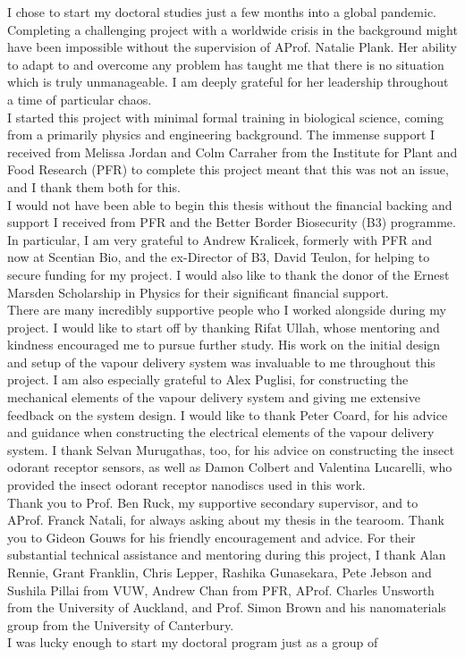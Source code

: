 \documentclass[
  a4paper,
]{scrbook}
\begin{document}
\begin{spacing}{1.2} 
\newpage
\fancyhf{} %
\thispagestyle{fancy} %
\renewcommand{\headrulewidth}{0pt}
\fancyfoot[L]{\thepage} %
I chose to start my doctoral studies just a few months into a global pandemic. Completing a challenging project with a worldwide crisis in the background might have been impossible without the supervision of AProf. Natalie Plank. Her ability to adapt to and overcome any problem has taught me that there is no situation which is truly unmanageable. I am deeply grateful for her leadership throughout a time of particular chaos. \\[5pt] I started this project with minimal formal training in biological science, coming from a primarily physics and engineering background. The immense support I received from Melissa Jordan and Colm Carraher from the Institute for Plant and Food Research (PFR) to complete this project meant that this was not an issue, and I thank them both for this. \\[5pt] I would not have been able to begin this thesis without the financial backing and support I received from PFR and the Better Border Biosecurity (B3) programme. In particular, I am very grateful to Andrew Kralicek, formerly with PFR and now at Scentian Bio, and the ex-Director of B3, David Teulon, for helping to secure funding for my project. I would also like to thank the donor of the Ernest Marsden Scholarship in Physics for their significant financial support. \\[5pt] There are many incredibly supportive people who I worked alongside during my project. I would like to start off by thanking Rifat Ullah, whose mentoring and kindness encouraged me to pursue further study. His work on the initial design and setup of the vapour delivery system was invaluable to me throughout this project. I am also especially grateful to Alex Puglisi, for constructing the mechanical elements of the vapour delivery system and giving me extensive feedback on the system design. I would like to thank Peter Coard, for his advice and guidance when constructing the electrical elements of the vapour delivery system. I thank Selvan Murugathas, too, for his advice on constructing the insect odorant receptor sensors, as well as Damon Colbert and Valentina Lucarelli, who provided the insect odorant receptor nanodiscs used in this work. \\[5pt] Thank you to Prof. Ben Ruck, my supportive secondary supervisor, and to AProf. Franck Natali, for always asking about my thesis in the tearoom. Thank you to Gideon Gouws for his friendly encouragement and advice. For their substantial technical assistance and mentoring during this project, I thank Alan Rennie, Grant Franklin, Chris Lepper, Rashika Gunasekara, Pete Jebson and Sushila Pillai from VUW, Andrew Chan from PFR, AProf. Charles Unsworth from the University of Auckland, and Prof. Simon Brown and his nanomaterials group from the University of Canterbury. \\[5pt] I was lucky enough to start my doctoral program just as a group of 
\end{spacing}
\end{document}
